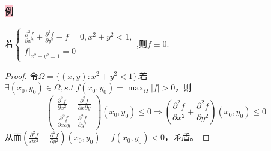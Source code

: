 \documentclass[UTF8]{ctexart}
\begin{document}
    \paragraph{\colorbox{pink}{例}}若$\begin{cases}
        \frac{\partial^2f}{\partial x^2}+\frac{\partial^2f}{\partial y^2}-f=0,x^2+y^2<1,\\
        f|_{x^2+y^2=1}=0
    \end{cases}$,则$f\equiv 0$.
    \begin{proof}
        令$\Omega=\{(x,y):x^2+y^2<1\}$.若$\exists(x_0,y_0)\in \Omega,s.t.f(x_0,y_0)=\max_{\Omega}|f|>0$，则$$\begin{pmatrix}
            \frac{\partial^2f}{\partial x^2}&\frac{\partial^2f}{\partial x\partial y}\\
            \frac{\partial^2f}{\partial x\partial y}&\frac{\partial^2f}{\partial y^2}
        \end{pmatrix}(x_0,y_0)\le 0\Rightarrow \left(\frac{\partial^2f}{\partial x^2}+\frac{\partial^2f}{\partial y^2}\right)(x_0,y_0)\le 0$$
        从而$\left(\frac{\partial^2f}{\partial x^2}+\frac{\partial^2f}{\partial y^2}\right)(x_0,y_0)-f(x_0,y_0)<0$，矛盾。
    \end{proof}
\end{document}

